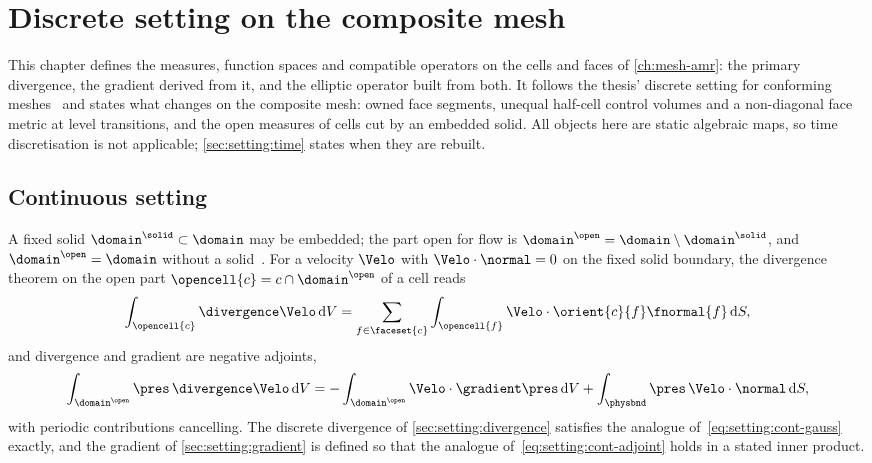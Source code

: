 \chapter{Discrete setting on the composite mesh}\label{ch:discrete-setting}
This chapter defines the measures, function spaces and compatible operators
on the cells and faces of \cref{ch:mesh-amr}: the primary divergence, the
gradient derived from it, and the elliptic operator built from both. It
follows the thesis' discrete setting for conforming
meshes~ and states what changes on the composite mesh: owned
face segments, unequal half-cell control volumes and a non-diagonal face
metric at level transitions, and the open measures of cells cut by an
embedded solid. All objects here are static algebraic maps, so time
discretisation is not applicable; \cref{sec:setting:time} states when they
are rebuilt.

\section{Continuous setting}\label{sec:setting:continuous}
A fixed solid $\domain^{\solid}\subset\domain$ may be embedded; the part open
for flow is $\domain^{\open}=\domain\setminus\domain^{\solid}$, and
$\domain^{\open}=\domain$ without a solid~. For a velocity
$\Velo$ with $\Velo\cdot\normal=0$ on the fixed solid boundary, the divergence
theorem on the open part $\opencell{c}=c\cap\domain^{\open}$ of a cell reads
\begin{equation}\label{eq:setting:cont-gauss}
  \integral{\opencell{c}}{\divergence\Velo}{V}
  =\sum_{f\in\faceset{c}}\integral{\opencell{f}}{\Velo\cdot\orient{c}{f}\fnormal{f}}{S},
\end{equation}
and divergence and gradient are negative adjoints,
\begin{equation}\label{eq:setting:cont-adjoint}
  \integral{\domain^{\open}}{\pres\,\divergence\Velo}{V}
  =-\integral{\domain^{\open}}{\Velo\cdot\gradient\pres}{V}
   +\integral{\physbnd}{\pres\,\Velo\cdot\normal}{S},
\end{equation}
with periodic contributions cancelling. The discrete divergence
of \cref{sec:setting:divergence} satisfies the analogue
of~\cref{eq:setting:cont-gauss} exactly, and the gradient of
\cref{sec:setting:gradient} is defined so that the analogue
of~\cref{eq:setting:cont-adjoint} holds in a stated inner product.

